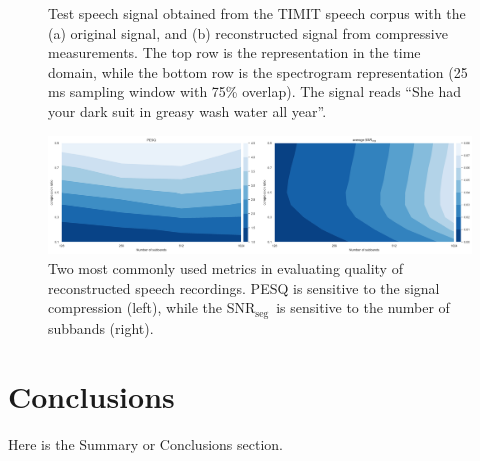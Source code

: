 \documentclass[10pt,a4paper,twoside]{article}
\newcommand{\snrseg}{SNR$_{\mathrm{seg}}$}
\begin{document}
\begin{figure}[tbp]
	\centering
	\quad %
	\caption{Test speech signal obtained from the TIMIT speech corpus with the (a) original signal, and (b) reconstructed signal from compressive measurements. The top row is the representation in the time domain, while the bottom row is the spectrogram representation (25 ms sampling window with 75\% overlap). The signal reads ``She had your dark suit in greasy wash water all year''.}\label{fig:spectrogram}
\end{figure}

\begin{figure}[tb]
	\centering
	\includegraphics[width=\textwidth]{metrics.png}
	\caption{Two most commonly used metrics in evaluating quality of reconstructed speech recordings. PESQ is sensitive to the signal compression (left), while the \snrseg~is sensitive to the number of subbands (right).}
	\label{fig:pesq-snr}
\end{figure}


\section{Conclusions}
Here is the Summary or Conclusions section.




\end{document}
